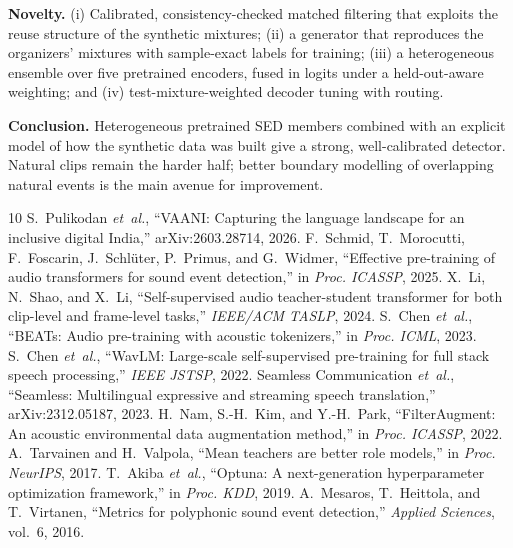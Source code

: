 \documentclass[conference]{IEEEtran}
\begin{document}
\textbf{Novelty.} (i) Calibrated, consistency-checked matched filtering that exploits the reuse structure of the
synthetic mixtures; (ii) a generator that reproduces the organizers' mixtures with sample-exact labels for training;
(iii) a heterogeneous ensemble over five pretrained encoders, fused in logits under a held-out-aware weighting; and
(iv) test-mixture-weighted decoder tuning with routing.

\textbf{Conclusion.} Heterogeneous pretrained SED members combined with an explicit model of how the synthetic data
was built give a strong, well-calibrated detector. Natural clips remain the harder half; better boundary modelling
of overlapping natural events is the main avenue for improvement.


\begin{thebibliography}{10}\setlength{\itemsep}{0pt}\footnotesize
{} S.~Pulikodan \emph{et~al.}, ``VAANI: Capturing the language landscape for an inclusive digital India,'' arXiv:2603.28714, 2026.
 F.~Schmid, T.~Morocutti, F.~Foscarin, J.~Schl\"uter, P.~Primus, and G.~Widmer, ``Effective pre-training of audio transformers for sound event detection,'' in \emph{Proc. ICASSP}, 2025.
 X.~Li, N.~Shao, and X.~Li, ``Self-supervised audio teacher-student transformer for both clip-level and frame-level tasks,'' \emph{IEEE/ACM TASLP}, 2024.
 S.~Chen \emph{et~al.}, ``BEATs: Audio pre-training with acoustic tokenizers,'' in \emph{Proc. ICML}, 2023.
 S.~Chen \emph{et~al.}, ``WavLM: Large-scale self-supervised pre-training for full stack speech processing,'' \emph{IEEE JSTSP}, 2022.
 Seamless Communication \emph{et~al.}, ``Seamless: Multilingual expressive and streaming speech translation,'' arXiv:2312.05187, 2023.
 H.~Nam, S.-H.~Kim, and Y.-H.~Park, ``FilterAugment: An acoustic environmental data augmentation method,'' in \emph{Proc. ICASSP}, 2022.
 A.~Tarvainen and H.~Valpola, ``Mean teachers are better role models,'' in \emph{Proc. NeurIPS}, 2017.
 T.~Akiba \emph{et~al.}, ``Optuna: A next-generation hyperparameter optimization framework,'' in \emph{Proc. KDD}, 2019.
 A.~Mesaros, T.~Heittola, and T.~Virtanen, ``Metrics for polyphonic sound event detection,'' \emph{Applied Sciences}, vol.~6, 2016.
\end{thebibliography}
\end{document}
